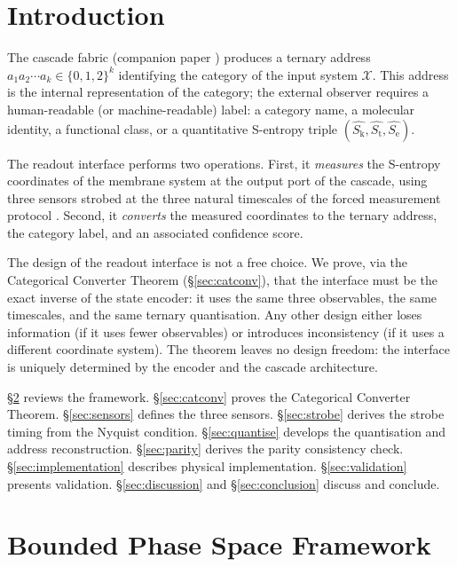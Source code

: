 \documentclass[11pt,twocolumn,a4paper]{article}
\theoremstyle{definition}
\theoremstyle{remark}
\newcommand{\Sk}{S_{\mathrm{k}}}
\newcommand{\St}{S_{\mathrm{t}}}
\newcommand{\Se}{S_{\mathrm{e}}}
\begin{document}
\section{Introduction}
\label{sec:introduction}

The cascade fabric (companion paper \citep{companion5}) produces a ternary
address $a_1 a_2 \cdots a_k \in \{0,1,2\}^k$ identifying the category of the
input system $\mathcal{X}$. This address is the internal representation of the
category; the external observer requires a human-readable (or machine-readable)
label: a category name, a molecular identity, a functional class, or a
quantitative S-entropy triple $(\hat{\Sk}, \hat{\St}, \hat{\Se})$.

The readout interface performs two operations. First, it \emph{measures} the
S-entropy coordinates of the membrane system at the output port of the cascade,
using three sensors strobed at the three natural timescales of the forced
measurement protocol \citep{companion2}. Second, it \emph{converts} the measured
coordinates to the ternary address, the category label, and an associated
confidence score.

The design of the readout interface is not a free choice. We prove, via the
Categorical Converter Theorem (\S\ref{sec:catconv}), that the interface must
be the exact inverse of the state encoder: it uses the same three observables,
the same timescales, and the same ternary quantisation. Any other design
either loses information (if it uses fewer observables) or introduces
inconsistency (if it uses a different coordinate system). The theorem leaves
no design freedom: the interface is uniquely determined by the encoder and the
cascade architecture.

\S\ref{sec:bps} reviews the framework.
\S\ref{sec:catconv} proves the Categorical Converter Theorem.
\S\ref{sec:sensors} defines the three sensors.
\S\ref{sec:strobe} derives the strobe timing from the Nyquist condition.
\S\ref{sec:quantise} develops the quantisation and address reconstruction.
\S\ref{sec:parity} derives the parity consistency check.
\S\ref{sec:implementation} describes physical implementation.
\S\ref{sec:validation} presents validation.
\S\ref{sec:discussion} and \S\ref{sec:conclusion} discuss and conclude.

\section{Bounded Phase Space Framework}
\label{sec:bps}
\end{document}
